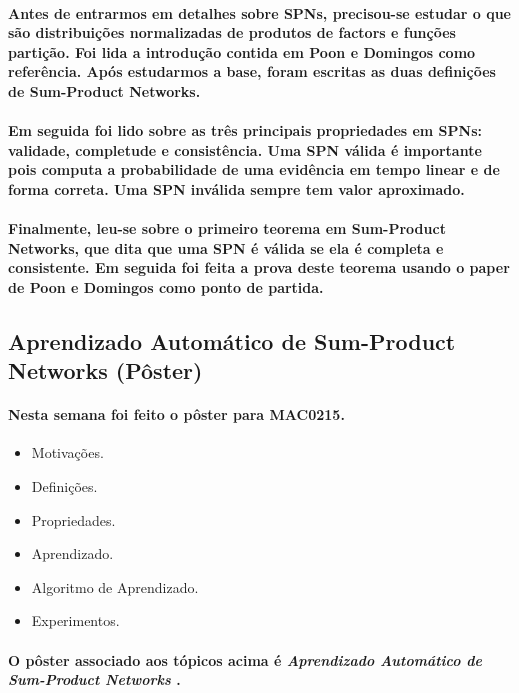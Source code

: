 \documentclass[a4paper,10pt]{article}
\theoremstyle{plain}
\begin{document}
\paragraph{
  Antes de entrarmos em detalhes sobre SPNs, precisou-se estudar o que são distribuições
  normalizadas de produtos de factors e funções partição. Foi lida a introdução contida em Poon e
  Domingos como referência. Após estudarmos a base, foram escritas as duas definições de
  Sum-Product Networks.
}

\paragraph{
  Em seguida foi lido sobre as três principais propriedades em SPNs: validade, completude e
  consistência. Uma SPN válida é importante pois computa a probabilidade de uma evidência em tempo
  linear e de forma correta. Uma SPN inválida sempre tem valor aproximado.
}

\paragraph{
  Finalmente, leu-se sobre o primeiro teorema em Sum-Product Networks, que dita que uma SPN é
  válida se ela é completa e consistente. Em seguida foi feita a prova deste teorema usando o
  paper de Poon e Domingos como ponto de partida.
}

\subsection{Aprendizado Automático de Sum-Product Networks (Pôster)}

\paragraph{
  Nesta semana foi feito o pôster para MAC0215.
}

\begin{itemize}
  \item Motivações.
  \item Definições.
  \item Propriedades.
  \item Aprendizado.
  \item Algoritmo de Aprendizado.
  \item Experimentos.
\end{itemize}

\paragraph{
  O pôster associado aos tópicos acima é \textit{Aprendizado Automático de Sum-Product Networks}
  \cite{poster-spn}.
}
\end{document}
